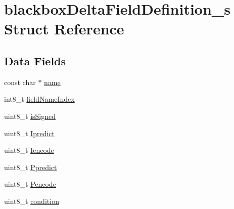 \hypertarget{structblackboxDeltaFieldDefinition__s}{\section{blackbox\+Delta\+Field\+Definition\+\_\+s Struct Reference}
\label{structblackboxDeltaFieldDefinition__s}
}
\subsection*{Data Fields}
\begin{DoxyCompactItemize}
\item 
const char $\ast$ \hyperlink{structblackboxDeltaFieldDefinition__s_ab3c0e94d4d83138b267d90ead6952a71}{name}
\item 
int8\+\_\+t \hyperlink{structblackboxDeltaFieldDefinition__s_acc4ded2cab4e3873fe825c9194c6e36d}{field\+Name\+Index}
\item 
uint8\+\_\+t \hyperlink{structblackboxDeltaFieldDefinition__s_ab5e4700555199936a8746c4bbbcdf26b}{is\+Signed}
\item 
uint8\+\_\+t \hyperlink{structblackboxDeltaFieldDefinition__s_abbb76c907037be315a04fcbac120194f}{Ipredict}
\item 
uint8\+\_\+t \hyperlink{structblackboxDeltaFieldDefinition__s_a615b26dd2c24963bd5174184dafa0d77}{Iencode}
\item 
uint8\+\_\+t \hyperlink{structblackboxDeltaFieldDefinition__s_ac79b1885c1d98b701c0a0ae3b2c51efe}{Ppredict}
\item 
uint8\+\_\+t \hyperlink{structblackboxDeltaFieldDefinition__s_a40bb092abf3caf01550e106a408fc6bc}{Pencode}
\item 
uint8\+\_\+t \hyperlink{structblackboxDeltaFieldDefinition__s_a8ab14a479f7b4a9f942342abc3903eeb}{condition}
\end{DoxyCompactItemize}


